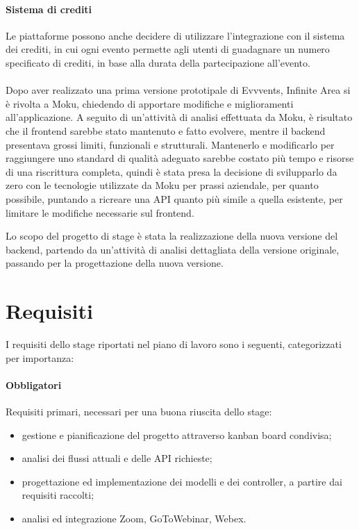 \paragraph{Sistema di crediti} Le piattaforme possono anche decidere di utilizzare l'integrazione con il sistema dei crediti, in cui ogni evento permette agli utenti di guadagnare un numero specificato di crediti, in base alla durata della partecipazione all'evento.

\paragraph{}
Dopo aver realizzato una prima versione prototipale di Evvvents, Infinite Area si è rivolta a Moku, chiedendo di apportare modifiche e miglioramenti all'applicazione. A seguito di un'attività di analisi effettuata da Moku, è risultato che il frontend sarebbe stato mantenuto e fatto evolvere, mentre il backend presentava grossi limiti, funzionali e strutturali. Mantenerlo e modificarlo per raggiungere uno standard di qualità adeguato sarebbe costato più tempo e risorse di una riscrittura completa, quindi è stata presa la decisione di svilupparlo da zero con le tecnologie utilizzate da Moku per prassi aziendale, per quanto possibile, puntando a ricreare una API quanto più simile a quella esistente, per limitare le modifiche necessarie sul frontend.

Lo scopo del progetto di stage è stata la realizzazione della nuova versione del backend, partendo da un'attività di analisi dettagliata della versione originale, passando per la progettazione della nuova versione.


\section{Requisiti}
I requisiti dello stage riportati nel piano di lavoro sono i seguenti, categorizzati per importanza:

\paragraph{Obbligatori} Requisiti primari, necessari per una buona riuscita dello stage:
\begin{itemize}
	\item gestione e pianificazione del progetto attraverso kanban board condivisa;
	\item analisi dei flussi attuali e delle API richieste;
	\item progettazione ed implementazione dei modelli e dei controller, a partire dai requisiti raccolti;
	\item analisi ed integrazione Zoom, GoToWebinar, Webex.
\end{itemize}

